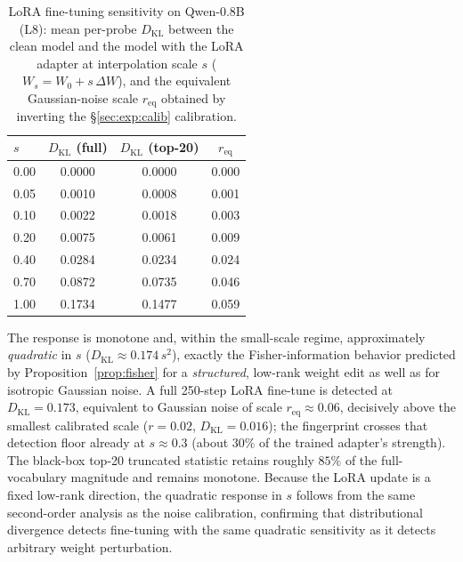 \documentclass[11pt]{article}
\theoremstyle{definition}
\begin{document}
\begin{table}[t]
\centering
\small
\caption{LoRA fine-tuning sensitivity on Qwen-0.8B (L8): mean per-probe
$D_{\mathrm{KL}}$ between the clean model and the model with the LoRA adapter
at interpolation scale $s$ ($W_s = W_0 + s\,\Delta W$), and the equivalent
Gaussian-noise scale $r_{\mathrm{eq}}$ obtained by inverting the
\S\ref{sec:exp:calib} calibration.}
\label{tab:lora}
\begin{tabular}{lccc}
\toprule
$s$ & $D_{\mathrm{KL}}$ (full) & $D_{\mathrm{KL}}$ (top-20) & $r_{\mathrm{eq}}$ \\
\midrule
0.00 & 0.0000 & 0.0000 & 0.000 \\
0.05 & 0.0010 & 0.0008 & 0.001 \\
0.10 & 0.0022 & 0.0018 & 0.003 \\
0.20 & 0.0075 & 0.0061 & 0.009 \\
0.40 & 0.0284 & 0.0234 & 0.024 \\
0.70 & 0.0872 & 0.0735 & 0.046 \\
1.00 & 0.1734 & 0.1477 & 0.059 \\
\bottomrule
\end{tabular}
\end{table}

The response is monotone and, within the small-scale regime, approximately
\emph{quadratic} in $s$ ($D_{\mathrm{KL}} \approx 0.174\,s^2$), exactly the
Fisher-information behavior predicted by Proposition~\ref{prop:fisher} for a
\emph{structured}, low-rank weight edit as well as for isotropic Gaussian
noise. A full 250-step LoRA fine-tune is detected at
$D_{\mathrm{KL}} = 0.173$, equivalent to Gaussian noise of scale
$r_{\mathrm{eq}} \approx 0.06$, decisively above the smallest calibrated scale
($r=0.02$, $D_{\mathrm{KL}}=0.016$); the fingerprint crosses that detection
floor already at $s \approx 0.3$ (about $30\%$ of the trained adapter's
strength). The black-box top-20 truncated statistic retains roughly $85\%$ of
the full-vocabulary magnitude and remains monotone. Because the LoRA update is
a fixed low-rank direction, the quadratic response in $s$ follows from the same
second-order analysis as the noise calibration, confirming that distributional
divergence detects fine-tuning with the same quadratic sensitivity as it
detects arbitrary weight perturbation.
\end{document}
